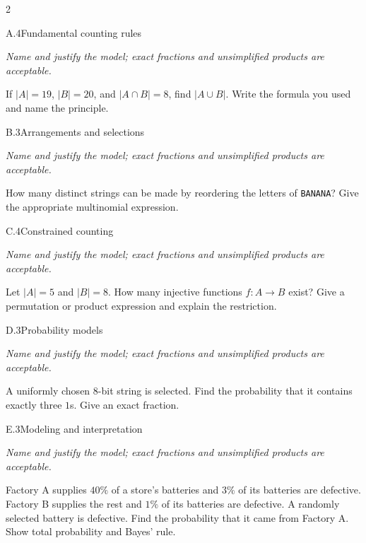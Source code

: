 \documentclass[9pt]{extarticle}
\begin{document}
\CoreWorkArea
\FormBreak
{}
\begin{multicols}{2}
\begin{CoreProblem}{A.4}{Fundamental counting rules}
{\scriptsize\textit{Name and justify the model; exact fractions and unsimplified products are acceptable.}\par}
If $|A|=19$, $|B|=20$, and $|A\cap B|=8$, find $|A\cup B|$. Write
    the formula you used and name the principle.
\end{CoreProblem}
\begin{CoreProblem}{B.3}{Arrangements and selections}
{\scriptsize\textit{Name and justify the model; exact fractions and unsimplified products are acceptable.}\par}
How many distinct strings can be made by reordering the letters of
    \texttt{BANANA}? Give the appropriate multinomial expression.
\end{CoreProblem}
\begin{CoreProblem}{C.4}{Constrained counting}
{\scriptsize\textit{Name and justify the model; exact fractions and unsimplified products are acceptable.}\par}
Let $|A|=5$ and $|B|=8$. How many injective functions $f:A\to B$
    exist? Give a permutation or product expression and explain the restriction.
\end{CoreProblem}
\columnbreak
\begin{CoreProblem}{D.3}{Probability models}
{\scriptsize\textit{Name and justify the model; exact fractions and unsimplified products are acceptable.}\par}
A uniformly chosen 8-bit string is selected. Find the probability
    that it contains exactly three $1$s. Give an exact fraction.
\end{CoreProblem}
\begin{CoreProblem}{E.3}{Modeling and interpretation}
{\scriptsize\textit{Name and justify the model; exact fractions and unsimplified products are acceptable.}\par}
Factory A supplies $40\%$ of a store's batteries and $3\%$ of its
    batteries are defective. Factory B supplies the rest and $1\%$ of its
    batteries are defective. A randomly selected battery is defective. Find the
    probability that it came from Factory A. Show total probability and Bayes'
    rule.
\end{CoreProblem}
\end{multicols}
\CoreWorkArea
\FormBreak
{}
\end{document}
